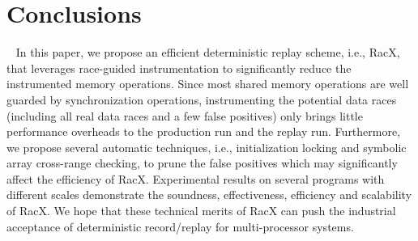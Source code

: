 \documentclass[10pt,onecolumn,letterpaper]{article}
\begin{document}
\section{Conclusions}~\label{sec:conclusion}
In this paper, we propose an efficient deterministic replay scheme,
i.e., RacX, that leverages race-guided instrumentation to
significantly reduce the instrumented memory operations. Since most
shared memory operations are well guarded by synchronization
operations, instrumenting the potential data races (including all
real data races and a few false positives) only brings little
performance overheads to the production run and the replay run.
Furthermore, we propose several automatic techniques, i.e.,
initialization locking and symbolic array cross-range checking, to
prune the false positives which may significantly affect the
efficiency of RacX. Experimental results on several programs with
different scales demonstrate the soundness, effectiveness,
efficiency and scalability of RacX. We hope that these technical
merits of RacX can push the industrial acceptance of deterministic
record/replay for multi-processor systems.
\end{document}
